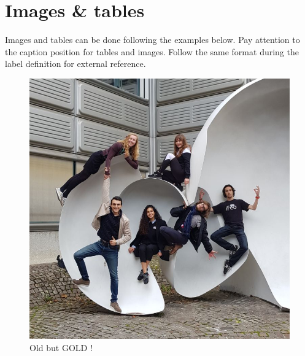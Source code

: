 \newpage
\section{Images \& tables}
\label{sec:images-tables}

Images and tables can be done following the examples below. Pay attention to the caption position for tables and images. Follow the same format during the label definition for external reference.

\begin{figure}[ht]
    \centering
    \includegraphics[scale=0.3]{images/CHIC.png}
    \caption{Old but GOLD !}
    \label{fig:CHIC}
\end{figure}

